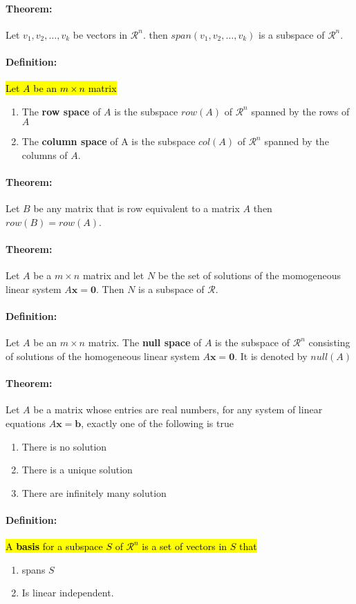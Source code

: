 \documentclass[12pt]{article}
\newenvironment{theorem}{\paragraph{Theorem:\hfill}}{\hfill}
\newenvironment{definition}{\paragraph{Definition: }}{\hfill}
\begin{document}
\begin{theorem}
	Let $v_1, v_2, \dots, v_k$ be vectors in $\mathcal{R}^n$. then $span(v_1, v_2, \dots, v_k)$ is a subspace of $\mathcal{R}^n$.
\end{theorem}

\begin{definition}
	\hl{Let $A$ be an $m \times n$ matrix}
	\begin{enumerate}
		\item The \textbf{row space} of $A$ is the subspace $row(A)$ of $\mathcal{R}^n$ spanned by the rows of $A$
		\item The \textbf{column space} of A is the subspace $col(A)$ of $\mathcal{R}^n$ spanned by the columns of $A$.
	\end{enumerate}
\end{definition}

\begin{theorem}
	Let $B$ be any matrix that is row equivalent to a matrix $A$ then $row(B) = row(A)$. 
\end{theorem}

\begin{theorem}
	Let $A$ be a $m \times n$ matrix and let $N$ be the set of solutions of the momogeneous linear system $A\textbf{x} = \textbf{0}$. Then $N$ is a subspace of $\mathcal{R}$.
\end{theorem}

\begin{definition}
	Let $A$ be an $m \times n$ matrix. The \textbf{null space} of $A$ is the subspace of $\mathcal{R}^n$ consisting of solutions of the homogeneous linear system $A\textbf{x} = \textbf{0}$. It is denoted by $null(A)$
\end{definition}

\begin{theorem}
	Let $A$ be a matrix whose entries are real numbers, for any system of linear equations $A \textbf{x} = \textbf{b}$, exactly one of the following is true
	\begin{enumerate}
		\item There is no solution
		\item There is a unique solution
		\item There are infinitely many solution
	\end{enumerate}
\end{theorem}

\begin{definition}
	\hl{
		A \textbf{basis} for a subspace $S$ of $\mathcal{R}^n$ is a set of vectors in $S$ that
	}
	\begin{enumerate}
		\item spans $S$
		\item Is linear independent.
	\end{enumerate}
\end{definition}
\end{document}
